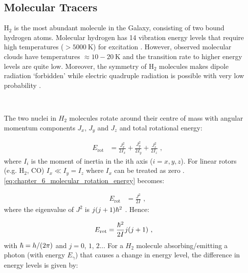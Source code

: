 \subsection{Molecular Tracers} \label{sec:06_molecular_tracers}

H$_2$ is the most abundant molecule in the Galaxy, consisting of two bound hydrogen atoms. Molecular hydrogen has 14 vibration energy levels that require high temperatures ($>5000~\si{\kelvin}$) for excitation \citep{2011piim.book.....D}. However, observed molecular clouds have temperatures $\approx 10-20~\si{\kelvin}$ \citep{2001RvMP...73.1031F} and the transition rate to higher energy levels are quite low. Moreover, the symmetry of H$_2$ molecules makes dipole radiation `forbidden' while electric quadruple radiation is possible with very low probability \citep{2011piim.book.....D}.
\par~\par 
The two nuclei in $H_2$ molecules rotate around their centre of mass with angular momentum components $J_x$, $J_y$ and $J_z$ \citep{alma99117570501811} and total rotational energy:

\begin{equation}
    \begin{aligned}
        E_\text{rot}&=\frac{J_x^2}{2I_x}+\frac{J_y^2}{2I_y}+\frac{J_z^2}{2I_z}\text{ ,}
    \end{aligned} \label{eq:chapter_6_molecular_rotation_energy}
\end{equation}
\noindent where $I_{i}$ is the moment of inertia in the ith axis ($i=x,y,z$). For linear rotors (e.g. H$_2$, CO)  $I_x\ll I_y=I_z$ where $I_x$ can be treated as zero \citep{alma9928060792901811}. \autoref{eq:chapter_6_molecular_rotation_energy} becomes:

\begin{equation}
    \begin{aligned}
        E_\text{rot}&=\frac{J^2}{2I}\text{ ,}
    \end{aligned}
\end{equation}
\noindent where the eigenvalue of $J^2$ is $j\qty(j+1)\hbar^2$ \citep{alma99117570501811}. Hence:

\begin{equation}
    \begin{aligned}
        E_\text{rot}&=\frac{\hbar^2}{2I}j\qty(j+1)\text{ ,}
    \end{aligned}
\end{equation}
\noindent with $\hbar=h/\qty(2\pi)$ and $j=0$, $1$, $2$... For a $H_2$ molecule absorbing/emitting a photon (with energy $E_\gamma$) that causes a change in energy level, the difference in energy levels is given by:

